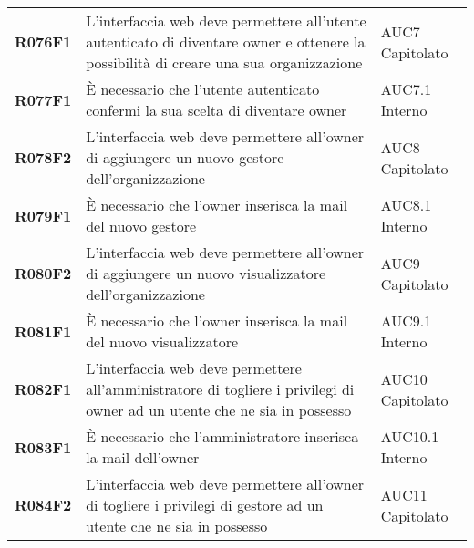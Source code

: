 \documentclass[../analisi-dei-requisiti.tex]{subfiles}
\begin{document}
\begin{longtable}[H]{>{\centering\bfseries}m{3cm} >{\centering}m{10cm} >{\centering\arraybackslash}m{3cm}}
  R076F1                               & L'interfaccia web deve permettere all'utente autenticato di diventare owner e ottenere la possibilità di creare una sua organizzazione                                                                  & AUC7 Capitolato               \\
  R077F1                               & È necessario che l'utente autenticato confermi la sua scelta di diventare owner                                                                                                                         & AUC7.1 Interno                \\
  R078F2                               & L'interfaccia web deve permettere all'owner di aggiungere un nuovo gestore dell'organizzazione                                                                                                          & AUC8 Capitolato               \\
  R079F1                               & È necessario che l'owner inserisca la mail del nuovo gestore                                                                                                                                            & AUC8.1 Interno                \\
  R080F2                               & L'interfaccia web deve permettere all'owner di aggiungere un nuovo visualizzatore dell'organizzazione                                                                                                   & AUC9 Capitolato               \\
  R081F1                               & È necessario che l'owner inserisca la mail del nuovo visualizzatore                                                                                                                                     & AUC9.1 Interno                \\
  R082F1                               & L'interfaccia web deve permettere all'amministratore di togliere i privilegi di owner ad un utente che ne sia in possesso                                                                               & AUC10 Capitolato              \\
  R083F1                               & È necessario che l'amministratore inserisca la mail dell'owner                                                                                                                                          & AUC10.1 Interno               \\
  R084F2                               & L'interfaccia web deve permettere all'owner di togliere i privilegi di gestore ad un utente che ne sia in possesso                                                                                      & AUC11 Capitolato              \\

\end{longtable}
\end{document}
